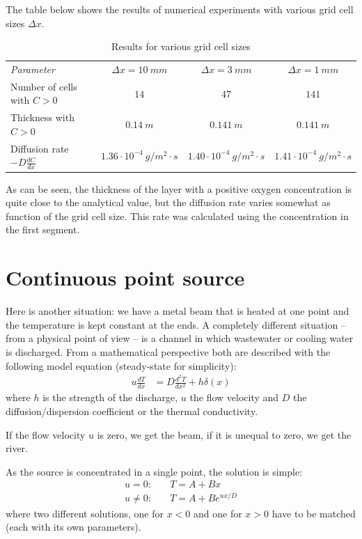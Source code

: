 \documentclass[onecolumn]{article}
\begin{document}
The table below shows the results of numerical experiments with various grid cell sizes $\Delta x$.
\begin{table}[H]
\caption{Results for various grid cell sizes}
\label{tableDiffOxygen}
\begin{tabular}{lccc}
\hline
\emph{Parameter}                   & $\Delta x = 10~mm$                & $\Delta x = 3~mm$                 & $\Delta x = 1~mm$ \\
Number of cells with $C > 0$       &     $14$                          &     $47$                          &    $141$          \\
Thickness with $C > 0$             &    $0.14~m$                       &     $0.141~m$                     &    $0.141~m$      \\
Diffusion rate $- D \frac{dC}{dx}$ & $1.36 \cdot 10^{-4}~g/m^2\cdot s$ & $1.40 \cdot 10^{-4}~g/m^2\cdot s$ & $1.41 \cdot 10^{-4}~g/m^2\cdot s$ \\
\hline
\end{tabular}
\end{table}

As can be seen, the thickness of the layer with a positive oxygen concentration is quite close
to the analytical value, but the diffusion rate varies somewhat as function of the grid cell size.
This rate was calculated using the concentration in the first segment.


\section*{Continuous point source}
\label{pointSource}
Here is another situation: we have a metal beam that is heated at one point and the temperature is
kept constant at the ends. A completely different situation -- from a physical point of view -- is a channel
in which wastewater or cooling water is discharged. From a mathematical perspective both are described
with the following model equation (steady-state for simplicity):
%
\begin{align}
\label{eqnDeltaSource}
          u \frac{d T}{d x} & =
              D \frac{d^2 T}{d x^2} + h \delta(x)
\end{align}
\noindent where $h$ is the strength of the discharge, $u$ the flow velocity and $D$ the diffusion/dispersion coefficient
or the thermal conductivity.

If the flow velocity $u$ is zero, we get the beam, if it is unequal to zero, we get the river.

As the source is concentrated in a single point, the solution is simple:
%
\begin{align}
             u = 0: & \quad T = A + B x \\
\nonumber u \neq 0: & \quad T = A + B e^{u x / D}
\end{align}
\noindent where two different solutions, one for $x < 0$ and one for $x > 0$ have to be matched
(each with its own parameters).
\end{document}
